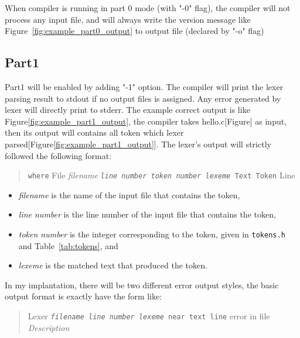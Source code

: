 \documentclass{report}
\newcommand{\+}{}
\begin{document}
    When compiler is running in part 0 mode (with "-0" flag), the compiler will not process any input file, and will
    always write the version message like Figure~\ref{fig:example_part0_output} to output file (declared by "-o" flag)

    \subsection{Part1}\label{subsec:part1}
    Part1 will be enabled by adding "-1" option. The compiler will print the lexer parsing result to stdout if no output
    files is assigned. Any error generated by lexer will directly print to stderr. The example correct output is like
    Figure\ref{fig:example_part1_output}, the compiler takes hello.c[Figure] as input, then its output will contains all
    token which lexer parsed[Figure\ref{fig:example_part1_output}]. The lexer's output will strictly followed the
    following format:
    \begin{quote}
    {\texttt{where} File}
        \emph{filename}
        {\texttt{\emph{line number}
        {\texttt{\emph{token number}
        {\texttt{\emph{lexeme}} Text}} Token}} Line}
    \end{quote}

    \begin{itemize}
        \item \emph{filename}
        is the name of the input file that contains the token,
        \item \emph{line number}
        is the line number of the input file that contains the token,
        \item \emph{token number}
        is the integer corresponding to the token, given in \verb|tokens.h|
        and Table~\ref{tab:tokens}, and
        \item \emph{lexeme}
        is the matched text that produced the token.
    \end{itemize}

    In my implantation, there will be two different error output styles, the basic output format is exactly have the form like:
    \begin{quote}
        \begin{tabbing}
        {\texttt{} Lexer}
            \= {\texttt{\emph{filename}
            {\texttt{\emph{line number}
            {\texttt{\emph{lexeme}} near text}} line}} error in file}
            \\
            \> \emph{Description}
        \end{tabbing}
    \end{quote}
\end{document}
